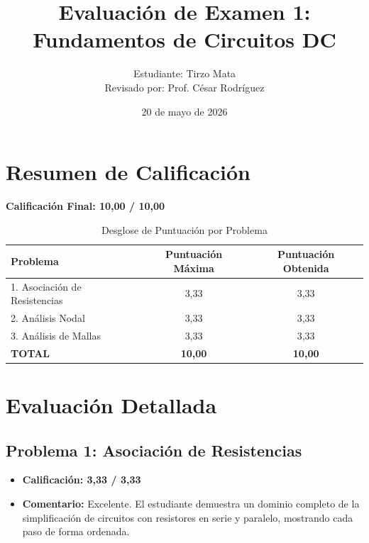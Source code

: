 \documentclass[12pt,a4paper]{article}
\title{Evaluación de Examen 1: Fundamentos de Circuitos DC}
\author{Estudiante: Tirzo Mata \\ \vspace{0.5cm} \large{Revisado por: Prof. César Rodríguez}}
\date{20 de mayo de 2026}
\begin{document}
\maketitle

\section*{Resumen de Calificación}

\begin{center}
    \huge \textbf{Calificación Final: 10,00 / 10,00}
\end{center}

\vspace{1cm}

\begin{table}[H]
    \centering
    \caption{Desglose de Puntuación por Problema}
    \label{tab:calificaciones}
    \begin{tabular}{@{}lcc@{}}
    \toprule
    \textbf{Problema} & \textbf{Puntuación Máxima} & \textbf{Puntuación Obtenida} \\
    \midrule
    1. Asociación de Resistencias & 3,33 & 3,33 \\
    2. Análisis Nodal & 3,33 & 3,33 \\
    3. Análisis de Mallas & 3,33 & 3,33 \\
    \midrule
    \textbf{TOTAL} & \textbf{10,00} & \textbf{10,00} \\
    \bottomrule
    \end{tabular}
\end{table}

\newpage

\section{Evaluación Detallada}

\subsection{Problema 1: Asociación de Resistencias}

\begin{itemize}
    \item \textbf{Calificación: 3,33 / 3,33}
    \item \textbf{Comentario:} Excelente. El estudiante demuestra un dominio completo de la simplificación de circuitos con resistores en serie y paralelo, mostrando cada paso de forma ordenada.
\end{itemize}
\end{document}
